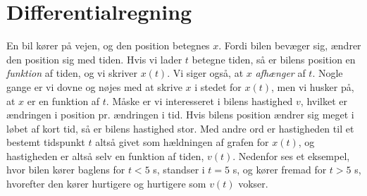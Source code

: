 \section{Differentialregning}
En bil kører på vejen, og den position betegnes $x$. Fordi bilen
bevæger sig, ændrer den position sig med tiden. Hvis vi lader $t$
betegne tiden, så er bilens position en \emph{funktion} af tiden, og
vi skriver $x(t)$. Vi siger også, at $x$ \emph{afhænger} af $t$. Nogle
gange er vi dovne og nøjes med at skrive $x$ i stedet for $x(t)$, men
vi husker på, at $x$ er en funktion af $t$. Måske er vi interesseret i
bilens hastighed $v$, hvilket er ændringen i position pr. ændringen i
tid. Hvis bilens position ændrer sig meget i løbet af kort tid, så er
bilens hastighed stor. Med andre ord er hastigheden til et bestemt
tidspunkt $t$ altså givet som hældningen af grafen for $x(t)$, og
hastigheden er altså selv en funktion af tiden, $v(t)$. Nedenfor ses
et eksempel, hvor bilen kører baglens for $t<5$ s, standser i $t=5$ s,
og kører fremad for $t>5$ s, hvorefter den kører hurtigere og
hurtigere som $v(t)$ vokser.

\begin{center}
\end{center}

